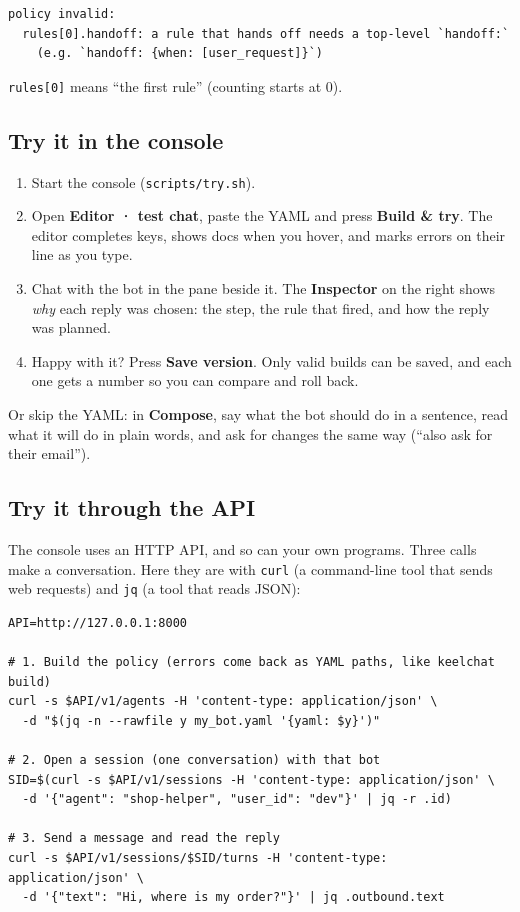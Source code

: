 \documentclass[11pt,a4paper]{article}
\newcommand{\codeus}{\textunderscore\allowbreak}
\newcommand{\code}[1]{{\renewcommand{\_}{\codeus}\texttt{\upshape #1}}}
\begin{document}
\begin{lstlisting}[style=bashstyle]
policy invalid:
  rules[0].handoff: a rule that hands off needs a top-level `handoff:`
    (e.g. `handoff: {when: [user_request]}`)
\end{lstlisting}

\code{rules[0]} means ``the first rule'' (counting starts at 0).

\subsection{Try it in the console}

\begin{enumerate}[leftmargin=1.4em]
  \item Start the console (\code{scripts/try.sh}).
  \item Open \textbf{Editor · test chat}, paste the YAML and press \textbf{Build \& try}. The editor completes keys,
    shows docs when you hover, and marks errors on their line as you type.
  \item Chat with the bot in the pane beside it. The \textbf{Inspector} on the right shows \emph{why} each reply
    was chosen: the step, the rule that fired, and how the reply was planned.
  \item Happy with it? Press \textbf{Save version}. Only valid builds can be saved, and each one gets a number so
    you can compare and roll back.
\end{enumerate}

Or skip the YAML: in \textbf{Compose}, say what the bot should do in a sentence, read what it will do in plain
words, and ask for changes the same way (``also ask for their email'').

\subsection{Try it through the API}

The console uses an HTTP API, and so can your own programs. Three calls make a conversation. Here they are with
\code{curl} (a command-line tool that sends web requests) and \code{jq} (a tool that reads JSON):

\begin{lstlisting}[style=bashstyle]
API=http://127.0.0.1:8000

# 1. Build the policy (errors come back as YAML paths, like keelchat build)
curl -s $API/v1/agents -H 'content-type: application/json' \
  -d "$(jq -n --rawfile y my_bot.yaml '{yaml: $y}')"

# 2. Open a session (one conversation) with that bot
SID=$(curl -s $API/v1/sessions -H 'content-type: application/json' \
  -d '{"agent": "shop-helper", "user_id": "dev"}' | jq -r .id)

# 3. Send a message and read the reply
curl -s $API/v1/sessions/$SID/turns -H 'content-type: application/json' \
  -d '{"text": "Hi, where is my order?"}' | jq .outbound.text
\end{lstlisting}
\end{document}
